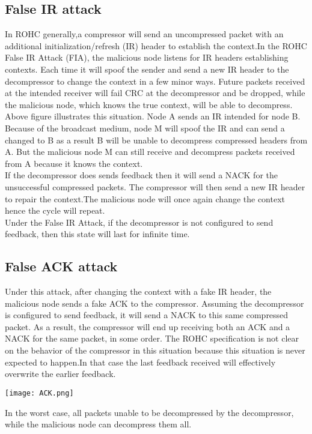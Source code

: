 \documentclass[a4paper,11pt]{article}
\begin{document}
\subsection{False IR attack} 
In ROHC generally,a compressor will send an uncompressed packet with an additional initialization/refresh (IR) header to establish the context.In the ROHC False IR Attack (FIA), the malicious node listens for IR headers establishing contexts. Each time  it will spoof the sender and send a new IR header to the decompressor to change the context in a few minor ways. Future packets received at the intended receiver will fail CRC at the decompressor and be dropped, while the malicious node, which knows the true context, will be able to decompress.\\                                                                                                
Above figure  illustrates this situation. Node A sends an IR intended for node B. Because of the broadcast medium, node M will spoof the IR and can send a changed to B as a result B will be unable to decompress compressed headers from A. But the malicious node M can still receive and decompress packets received from A  because it knows the context.\\
If the decompressor does sends feedback then it will send a NACK for the unsuccessful compressed packets. The compressor will then send a new IR header to repair the context.The malicious node will once again change the context hence the cycle will  repeat.\\
Under the False IR Attack, if the decompressor is not configured to send feedback, then this state will last for infinite time.
\subsection{False ACK attack}
Under this attack, after changing the context with a fake IR header, the malicious node sends a fake ACK to the compressor. Assuming the decompressor is configured to send feedback, it will send a NACK to this same compressed packet. As a result, the compressor will end up receiving both an ACK and a NACK for the same packet, in some order. The ROHC specification is not clear on the behavior of the compressor in this situation because this situation is never expected to happen.In that case the last feedback received will effectively overwrite the earlier feedback.\\
\begin{center}
	\texttt{[image: ACK.png]}
\end{center}
In the worst case, all packets unable to be decompressed by the decompressor, while the malicious
node can decompress them all. 
\end{document}
